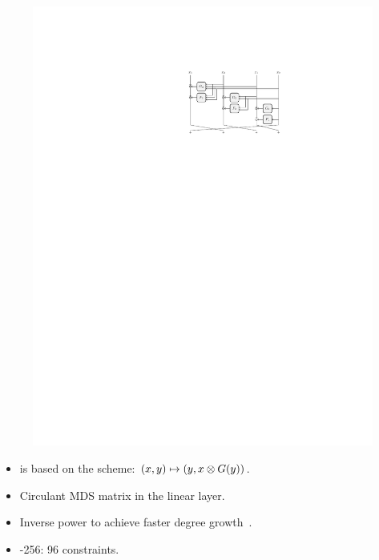 \documentclass[beamer={10pt,xcolor=dvipsnames},target=mst]{thud}
\begin{document}
\begin{frame}{\Griffin{}~\cite{GrassiHRSWW2022}}
  \begin{figure}
    \centering
    \includegraphics[scale=0.75]{res/GrassiHRSWW2022.pdf}
  \end{figure}
  \begin{itemize}
    \item \Griffin{} is based on the \Horst{} scheme: \(\Tuple{x, y} \mapsto \Tuple{y, x \otimes \call{G}{y}}\).
    \item Circulant MDS matrix in the linear layer.
    \item Inverse power to achieve faster degree growth~\cite{AlyABDS2019}.
    \item \Griffin{}-256: 96 constraints.
  \end{itemize}
\end{frame}
\end{document}
